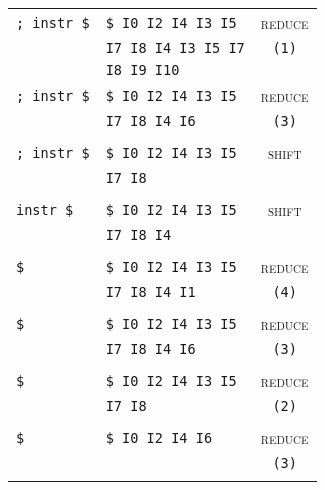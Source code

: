 \documentclass[a4paper,10pt]{article}
\begin{document}
\begin{enumerate}
\begin{enumerate}
\begin{center}
\begin{tabular}{ | l | l | c |}
                    \verb|; instr $| & \verb|$ I0 I2 I4 I3 I5| & \textsc{reduce} \\
                    & \verb|I7 I8 I4 I3 I5 I7| & \verb|(1)|\\
                    & \verb|I8 I9 I10| & \\ \hline

                    \verb|; instr $| & \verb|$ I0 I2 I4 I3 I5| & \textsc{reduce} \\
                    & \verb|I7 I8 I4 I6| & \verb|(3)| \\
                    & & \\ \hline

                    \verb|; instr $| & \verb|$ I0 I2 I4 I3 I5| & \textsc{shift} \\
                    & \verb|I7 I8| &  \\
                    & & \\ \hline

                    \verb|instr $| & \verb|$ I0 I2 I4 I3 I5| & \textsc{shift} \\
                    & \verb|I7 I8 I4| &  \\
                    & & \\ \hline

                    \verb|$| & \verb|$ I0 I2 I4 I3 I5| & \textsc{reduce} \\
                    & \verb|I7 I8 I4 I1| &  \verb|(4)|\\
                    & & \\ \hline

                    \verb|$| & \verb|$ I0 I2 I4 I3 I5| & \textsc{reduce} \\
                    & \verb|I7 I8 I4 I6| &  \verb|(3)|\\
                    & & \\ \hline

                    \verb|$| & \verb|$ I0 I2 I4 I3 I5| & \textsc{reduce} \\
                    & \verb|I7 I8| &  \verb|(2)|\\
                    & & \\ \hline

                    \verb|$| & \verb|$ I0 I2 I4 I6| & \textsc{reduce} \\
                    & &  \verb|(3)|\\
                    & & \\ \hline


\end{tabular}
\end{center}
\end{enumerate}
\end{enumerate}
\end{document}
